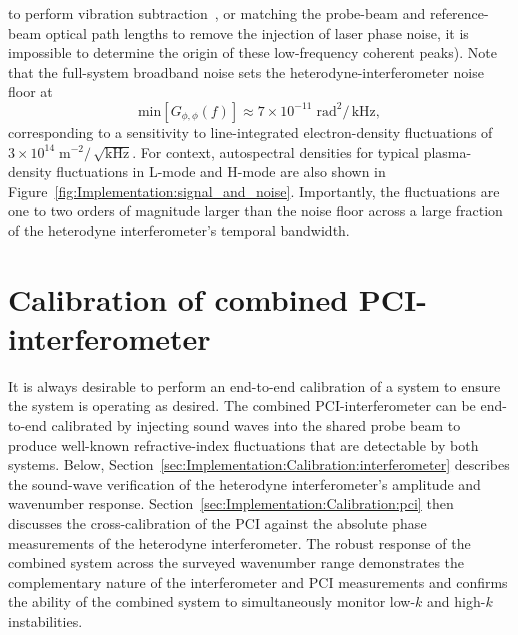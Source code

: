 to perform vibration subtraction~\cite{carlstrom_rsi88}, or
matching the probe-beam and reference-beam optical path lengths
to remove the injection of laser phase noise,
it is impossible to determine the origin
of these low-frequency coherent peaks).
Note that the full-system broadband noise
sets the heterodyne-interferometer noise floor at
\begin{equation}
  \text{min} \left[ G_{\phi,\phi}(f) \right]
  \approx
  7 \times 10^{-11} \; \text{rad}^2 / \, \text{kHz},
  \label{eq:Implementation:noise_floor_rad2_per_Hz}
\end{equation}
corresponding to a sensitivity
to line-integrated electron-density fluctuations of
$3 \times 10^{14} \; \text{m}^{-2} / \, \sqrt{\text{kHz}}$.
For context, autospectral densities for typical plasma-density fluctuations
in L-mode and H-mode are also shown in
Figure~\ref{fig:Implementation:signal_and_noise}.
Importantly, the fluctuations are one to two
orders of magnitude larger than the noise floor
across a large fraction of the heterodyne interferometer's temporal bandwidth.


\section{Calibration of combined PCI-interferometer}
\label{sec:Implementation:Calibration}
It is always desirable to perform an end-to-end calibration of a system
to ensure the system is operating as desired.
The combined PCI-interferometer can be end-to-end calibrated
by injecting sound waves into the shared probe beam
to produce well-known refractive-index fluctuations
that are detectable by both systems.
Below, Section~\ref{sec:Implementation:Calibration:interferometer}
describes the sound-wave verification of
the heterodyne interferometer's amplitude and wavenumber response.
Section~\ref{sec:Implementation:Calibration:pci}
then discusses the cross-calibration of the PCI
against the absolute phase measurements
of the heterodyne interferometer.
The robust response of the combined system
across the surveyed wavenumber range
demonstrates the complementary nature
of the interferometer and PCI measurements and
confirms the ability of the combined system
to simultaneously monitor low-$k$ and high-$k$ instabilities.



